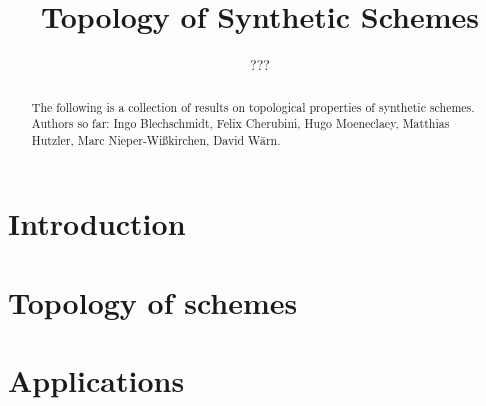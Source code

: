 \documentclass{../util/zariski}
\title{Topology of Synthetic Schemes}
\author{???}
\begin{document}
\maketitle

\begin{abstract}
  The following is a collection of results on topological properties of synthetic schemes.
  Authors so far: Ingo Blechschmidt, Felix Cherubini, Hugo Moeneclaey, Matthias Hutzler, Marc Nieper-Wißkirchen, David Wärn.
\end{abstract}

\tableofcontents

\section*{Introduction}


\section{Topology of schemes}



\section{Applications}


\printindex

\printbibliography
\end{document}
